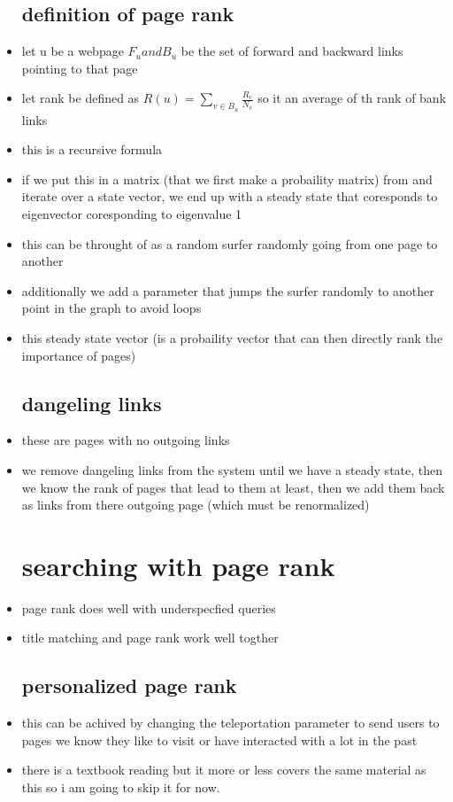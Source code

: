 \documentclass{article}
\begin{document}
\begin{itemize}
\subsection*{definition of page rank}
\item let u be a webpage $F_u and B_u$ be the set of forward and backward links pointing to that page
\item let rank be defined as $R(u)=\sum_{v\in B_u}\frac{R_v}{N_v}$ so it an average of th rank of bank links 
\item this is a recursive formula 
\item if we put this in a matrix (that we first make a probaility matrix) from and iterate over a state vector, we end up with a steady state that coresponds to eigenvector coresponding to eigenvalue 1 
\item this can be throught of  as a random surfer randomly going from one page to another 
\item additionally we add a parameter that jumps the surfer randomly to another point in the graph to avoid loops 
\item this steady state vector (is a probaility vector that can then directly rank the importance of pages)
\subsection*{dangeling links}
\item these are pages with no outgoing links 
\item we remove dangeling links from the system until we have a steady state, then we know the rank of pages that lead to them at least, then we add them back as links from there outgoing page (which must be renormalized)

\section*{searching with page rank }
\item page rank does well with underspecfied queries 
\item title matching and page rank work well togther 
\subsection*{personalized page rank}
\item this can be achived by changing the teleportation parameter to send users to pages we know they like to visit or have interacted with a lot in the past 


\item there is a textbook reading but it more or less covers the same material as this so i am going to skip it for now. 





\end{itemize}
\end{document}
